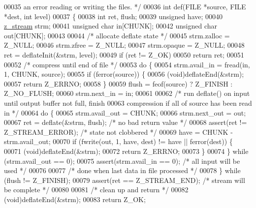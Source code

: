 \begin{DoxyCode}
00035 \textcolor{comment}{   an error reading or writing the files. */}
00036 \textcolor{keywordtype}{int} def(FILE *source, FILE *dest, \textcolor{keywordtype}{int} level)
00037 \{
00038     \textcolor{keywordtype}{int} ret, flush;
00039     \textcolor{keywordtype}{unsigned} have;
00040     \hyperlink{structz__stream__s}{z\_stream} strm;
00041     \textcolor{keywordtype}{unsigned} \textcolor{keywordtype}{char} in[CHUNK];
00042     \textcolor{keywordtype}{unsigned} \textcolor{keywordtype}{char} out[CHUNK];
00043 
00044     \textcolor{comment}{/* allocate deflate state */}
00045     strm.zalloc = Z\_NULL;
00046     strm.zfree = Z\_NULL;
00047     strm.opaque = Z\_NULL;
00048     ret = deflateInit(&strm, level);
00049     \textcolor{keywordflow}{if} (ret != Z\_OK)
00050         \textcolor{keywordflow}{return} ret;
00051 
00052     \textcolor{comment}{/* compress until end of file */}
00053     \textcolor{keywordflow}{do} \{
00054         strm.avail\_in = fread(in, 1, CHUNK, source);
00055         \textcolor{keywordflow}{if} (ferror(source)) \{
00056             (void)deflateEnd(&strm);
00057             \textcolor{keywordflow}{return} Z\_ERRNO;
00058         \}
00059         flush = feof(source) ? Z\_FINISH : Z\_NO\_FLUSH;
00060         strm.next\_in = in;
00061 
00062         \textcolor{comment}{/* run deflate() on input until output buffer not full, finish}
00063 \textcolor{comment}{           compression if all of source has been read in */}
00064         \textcolor{keywordflow}{do} \{
00065             strm.avail\_out = CHUNK;
00066             strm.next\_out = out;
00067             ret = deflate(&strm, flush);    \textcolor{comment}{/* no bad return value */}
00068             assert(ret != Z\_STREAM\_ERROR);  \textcolor{comment}{/* state not clobbered */}
00069             have = CHUNK - strm.avail\_out;
00070             \textcolor{keywordflow}{if} (fwrite(out, 1, have, dest) != have || ferror(dest)) \{
00071                 (void)deflateEnd(&strm);
00072                 \textcolor{keywordflow}{return} Z\_ERRNO;
00073             \}
00074         \} \textcolor{keywordflow}{while} (strm.avail\_out == 0);
00075         assert(strm.avail\_in == 0);     \textcolor{comment}{/* all input will be used */}
00076 
00077         \textcolor{comment}{/* done when last data in file processed */}
00078     \} \textcolor{keywordflow}{while} (flush != Z\_FINISH);
00079     assert(ret == Z\_STREAM\_END);        \textcolor{comment}{/* stream will be complete */}
00080 
00081     \textcolor{comment}{/* clean up and return */}
00082     (void)deflateEnd(&strm);
00083     \textcolor{keywordflow}{return} Z\_OK;

\end{DoxyCode}
